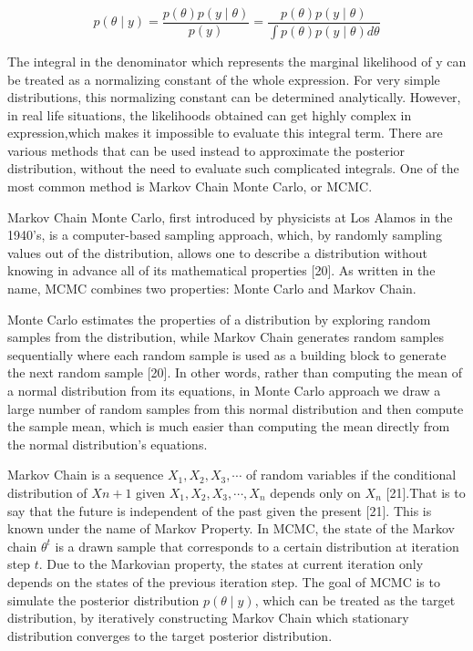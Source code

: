 \documentclass{usiinftr}
\begin{document}
\begin{equation} \label{Bayes}
p(\theta \mid y) = \frac{p(\theta)p(y \mid \theta)}{p(y)} = \frac{p(\theta)p(y \mid \theta)}{\int p(\theta)p(y \mid \theta) d\theta}
\end{equation}

The integral in the denominator which represents the marginal likelihood of y can be treated as a normalizing constant of the whole expression. For very simple distributions, this normalizing constant can be determined analytically. However, in real life situations, the likelihoods obtained can get highly complex in expression,which makes it impossible to evaluate this integral term. There are various methods that can be used instead to approximate the posterior distribution, without the need to evaluate such complicated integrals. One of the most common method is Markov Chain Monte Carlo, or MCMC.

Markov Chain Monte Carlo, first introduced by physicists at Los Alamos in the 1940's, is a computer-based sampling approach, which, by randomly sampling values out of the distribution, allows one to describe a distribution without knowing in advance all of its mathematical properties [20]. As written in the name, MCMC combines two properties: Monte Carlo and Markov Chain. 

Monte Carlo estimates the properties of a distribution by exploring random samples from the distribution, while Markov Chain generates random samples sequentially where each random sample is used as a building block to generate the next random sample [20]. In other words, rather than computing the mean of a normal distribution from its equations, in Monte Carlo approach we draw a large number of random samples from this normal distribution and then compute the sample mean, which is much easier than computing the mean directly from the normal distribution's equations.

Markov Chain is a sequence $X_1,X_2, X_3, \cdots$ of random variables if the conditional distribution of $X{n+1}$ given $X_1,X_2, X_3, \cdots, X_n$ depends only on $X_n$ [21].That is to say that the future is independent of the past given the present [21]. This is known under the name of Markov Property. In MCMC, the state of the Markov chain $\theta^{t}$ is a drawn sample that corresponds to a certain distribution at iteration step $t$. Due to the Markovian property, the states at current iteration only depends on the states of the previous iteration step. The goal of MCMC is to simulate the posterior distribution $p(\theta \mid y)$, which can be treated as the target distribution, by iteratively constructing Markov Chain which stationary distribution converges to the target posterior distribution. 
\end{document}
